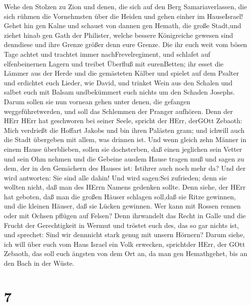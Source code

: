  Wehe den Stolzen zu Zion und denen, die sich auf den Berg
Samariaverlassen, die sich rühmen die Vornehmsten über die Heiden und
gehen einher im HauseIsrael!  Gehet hin gen Kalne und
schauet von dannen gen Hemath, die große Stadt,und ziehet hinab gen Gath
der Philister, welche bessere Königreiche gewesen sind denndiese und
ihre Grenze größer denn eure Grenze.  Die ihr euch weit vom
bösen Tage achtet und trachtet immer nachFrevelregiment, 
und schlafet auf elfenbeinernen Lagern und treibet Überfluß mit
eurenBetten; ihr esset die Lämmer aus der Herde und die gemästeten
Kälber  und spielet auf dem Psalter und erdichtet euch
Lieder, wie David,  und trinket Wein aus den Schalen und
salbet euch mit Balsam undbekümmert euch nichts um den Schaden Josephs.
 Darum sollen sie nun vornean gehen unter denen, die
gefangen weggeführetwerden, und soll das Schlemmen der Pranger aufhören.
 Denn der HErr HErr hat geschworen bei seiner Seele, spricht
der HErr, derGOtt Zebaoth: Mich verdrießt die Hoffart Jakobs und bin
ihren Palästen gram; und ichwill auch die Stadt übergeben mit allem, was
drinnen ist.  Und wenn gleich zehn Männer in einem Hause
überblieben, sollen sie dochsterben,  daß einen jeglichen
sein Vetter und sein Ohm nehmen und die Gebeine ausdem Hause tragen muß
und sagen zu dem, der in den Gemächern des Hauses ist: Istihrer auch
noch mehr da? Und der wird antworten: Sie sind alle dahin! Und wird
sagen:Sei zufrieden; denn sie wollten nicht, daß man des HErrn Namens
gedenken sollte.  Denn siehe, der HErr hat geboten, daß man
die großen Häuser schlagen soll,daß sie Ritze gewinnen, und die kleinen
Häuser, daß sie Lücken gewinnen.  Wer kann mit Rossen
rennen oder mit Ochsen pflügen auf Felsen? Denn ihrwandelt das Recht in
Galle und die Frucht der Gerechtigkeit in Wermut  und
tröstet euch des, das so gar nichts ist, und sprechet: Sind wir
dennnicht stark genug mit unsern Hörnern?  Darum siehe, ich
will über euch vom Haus Israel ein Volk erwecken, sprichtder HErr, der
GOtt Zebaoth, das soll euch ängsten von dem Ort an, da man gen
Hemathgehet, bis an den Bach in der Wüste.

\hypertarget{section-6}{%
\section{7}\label{section-6}}

